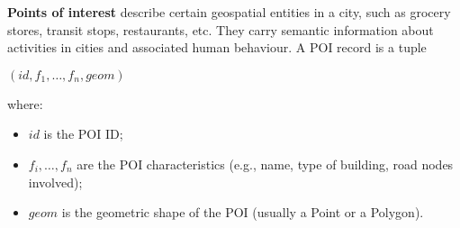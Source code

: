 \textbf{Points of interest} describe certain geospatial entities in a city, such as grocery stores, transit stops, restaurants, etc. They carry semantic information about activities in cities and associated human behaviour. A POI record is a tuple
\begin{center}
    $(id, f_1, \dots, f_n, geom)$
\end{center}
where:
\begin{itemize}[itemsep=-5pt, label=-]
    \item $id$ is the POI ID;
    \item $f_i, \dots, f_n$ are the POI characteristics (e.g., name, type of building, road nodes involved);
    \item $geom$ is the geometric shape of the POI (usually a Point or a Polygon).
\end{itemize}